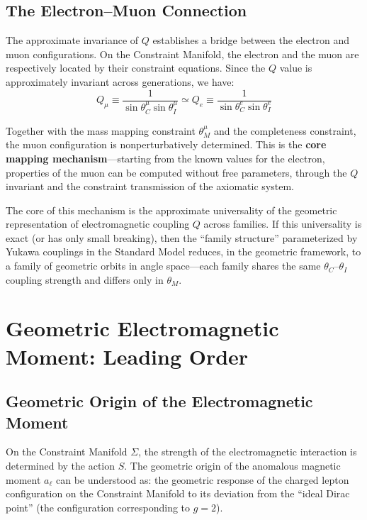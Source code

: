 \documentclass[aps,prd,reprint,nofootinbib]{revtex4-2}
\begin{document}
\subsection{The Electron--Muon Connection}

The approximate invariance of $Q$ establishes a bridge between the electron and muon configurations. On the Constraint Manifold, the electron and the muon are respectively located by their constraint equations. Since the $Q$ value is approximately invariant across generations, we have:
\begin{equation}
Q_\mu \equiv \frac{1}{\sin\theta_C^\mu\sin\theta_I^\mu} \simeq Q_e \equiv \frac{1}{\sin\theta_C^e\sin\theta_I^e} \label{eq:Qbridge}
\end{equation}

Together with the mass mapping constraint $\theta_M^\mu$ and the completeness constraint, the muon configuration is nonperturbatively determined. This is the \textbf{core mapping mechanism}---starting from the known values for the electron, properties of the muon can be computed without free parameters, through the $Q$ invariant and the constraint transmission of the axiomatic system.

The core of this mechanism is the approximate universality of the geometric representation of electromagnetic coupling $Q$ across families. If this universality is exact (or has only small breaking), then the ``family structure'' parameterized by Yukawa couplings in the Standard Model reduces, in the geometric framework, to a family of geometric orbits in angle space---each family shares the same $\theta_C$--$\theta_I$ coupling strength and differs only in $\theta_M$.

\section{Geometric Electromagnetic Moment: Leading Order}
\label{sec:leading}

\subsection{Geometric Origin of the Electromagnetic Moment}

On the Constraint Manifold $\Sigma$, the strength of the electromagnetic interaction is determined by the action $S$. The geometric origin of the anomalous magnetic moment $a_\ell$ can be understood as: the geometric response of the charged lepton configuration on the Constraint Manifold to its deviation from the ``ideal Dirac point'' (the configuration corresponding to $g = 2$).
\end{document}
